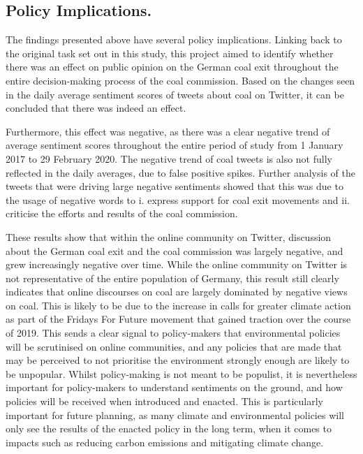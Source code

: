 \documentclass[12pt,onecolumn,twoside]{layout}
\begin{document}
\subsection*{Policy Implications.}
The findings presented above have several policy implications. Linking back to the original task set out in this study, this project aimed to identify whether there was an effect on public opinion on the German coal exit throughout the entire decision-making process of the coal commission. Based on the changes seen in the daily average sentiment scores of tweets about coal on Twitter, it can be concluded that there was indeed an effect.

Furthermore, this effect was negative, as there was a clear negative trend of average sentiment scores throughout the entire period of study from 1 January 2017 to 29 February 2020. The negative trend of coal tweets is also not fully reflected in the daily averages, due to false positive spikes. Further analysis of the tweets that were driving large negative sentiments showed that this was due to the usage of negative words to i. express support for coal exit movements and ii. criticise the efforts and results of the coal commission.

These results show that within the online community on Twitter, discussion about the German coal exit and the coal commission was largely negative, and grew increasingly negative over time. While the online community on Twitter is not representative of the entire population of Germany, this result still clearly indicates that online discourses on coal are largely dominated by negative views on coal. This is likely to be due to the increase in calls for greater climate action as part of the Fridays For Future movement that gained traction over the course of 2019. This sends a clear signal to policy-makers that environmental policies will be scrutinised on online communities, and any policies that are made that may be perceived to not prioritise the environment strongly enough are likely to be unpopular. Whilst policy-making is not meant to be populist, it is nevertheless important for policy-makers to understand sentiments on the ground, and how policies will be received when introduced and enacted. This is particularly important for future planning, as many climate and environmental policies will only see the results of the enacted policy in the long term, when it comes to impacts such as reducing carbon emissions and mitigating climate change.
\end{document}
